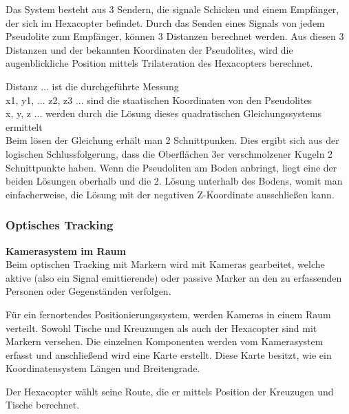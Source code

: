       Das System besteht aus 3 Sendern, die signale Schicken und einem Empfänger, der sich im Hexacopter befindet.
      Durch das Senden eines Signals von jedem Pseudolite zum Empfänger, können 3 Distanzen berechnet werden.
      Aus diesen 3 Distanzen und der bekannten Koordinaten der Pseudolites, wird die augenblickliche Position mittels Trilateration des Hexacopters berechnet.


      Distanz ... ist die durchgeführte Messung\\
      x1, y1, ... z2, z3 ... sind die staatischen Koordinaten von den Pseudolites \\
      x, y, z ... werden durch die Lösung dieses quadratischen Gleichungssystems ermittelt \\
      
      Beim lösen der Gleichung erhält man 2 Schnittpunken. Dies ergibt sich aus der logischen Schlussfolgerung, dass die Oberflächen 3er verschmolzener Kugeln 2 Schnittpunkte haben.
      Wenn die Pseudoliten am Boden anbringt, liegt eine der beiden Lösungen oberhalb und die 2. Lösung unterhalb des Bodens, womit man einfacherweise, die Lösung mit der negativen Z-Koordinate ausschließen kann.

    \subsubsection{Optisches Tracking}

  \textbf{Kamerasystem im Raum}\\

  Beim optischen Tracking mit Markern wird mit Kameras gearbeitet, welche aktive (also ein Signal emittierende) oder passive Marker an den zu erfassenden Personen oder Gegenständen verfolgen. 

  Für ein fernortendes Positionierungssystem, werden Kameras in einem Raum verteilt. 
  Sowohl Tische und Kreuzungen als auch der Hexacopter sind mit Markern versehen. Die einzelnen Komponenten werden vom Kamerasystem erfasst und anschließend wird eine Karte erstellt. Diese Karte besitzt, wie ein Koordinatensystem Längen und Breitengrade.

  Der Hexacopter wählt seine Route, die er mittels Position der Kreuzugen und Tische berechnet.

